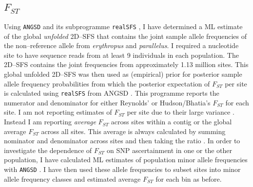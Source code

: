 \documentclass[a4paper,12pt,times,authoryear,twoside,print,index]{Classes/PhDThesisPSnPDF}\usepackage[]{graphicx}\usepackage[]{color}
\begin{document}
\subsection{$F_{ST}$}
%
%
Using \texttt{ANGSD} and its subprogramme \texttt{realSFS} \citep{Korneliussen2014}, I have determined a ML estimate of the global \emph{unfolded} 2D--\gls{SFS} that contains the joint sample allele frequencies of the non--reference allele from \textit{erythropus} and \textit{parallelus}. I required a nucleotide site to have sequence reads from at least 9 individuals in each population. The 2D--SFS contains the joint frequencies from approximately 1.13 million sites. This global unfolded 2D--\gls{SFS} was then used as (empirical) prior for posterior sample allele frequency probabilities from which the posterior expectation of $F_{ST}$ per site is calculated using \texttt{realSFS} from ANGSD \citep{Fumagalli2013}. This programme reports the numerator and denominator for either Reynolds' \citep[eq. 3]{Fumagalli2013} or Hudson/Bhatia's $F_{ST}$ \citep[eq. 9 and 10]{Bhatia2013} for each site. I am not reporting estimates of $F_{ST}$ per site due to their large variance \citep{Weir2005}. Instead I am reporting \emph{average} $F_{ST}$ across sites within a contig or the global average $F_{ST}$ across all sites. This average is always calculated by summing nominator and denominator across sites and then taking the ratio \citep{Bhatia2013}.
In order to investigate the dependence of $F_{ST}$ on SNP ascertainment in one or the other population, I have calculated ML estimates of population minor allele frequencies with \texttt{ANGSD} \citep{Kim2011}. I have then used these allele frequencies to subset sites into minor allele frequency classes and estimated average $F_{ST}$ for each bin as before.
%
%
\end{document}
